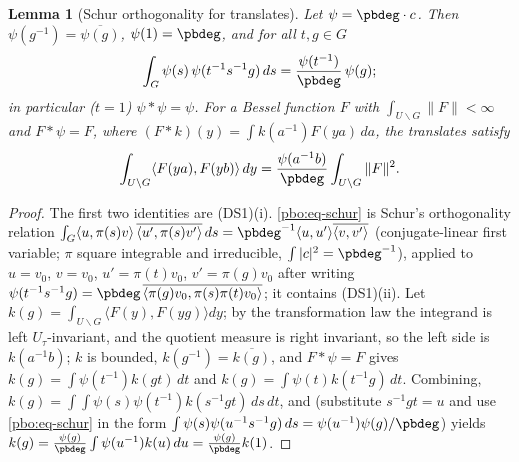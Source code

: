\documentclass[10pt]{amsart}
\newtheorem{lemma}[theorem]{Lemma}
\theoremstyle{definition}
\theoremstyle{remark}
\providecommand{\aubar}[1]{\overline{#1}}
\begin{document}
\begin{lemma}[Schur orthogonality for translates]\label{pbo:translates}
Let $\psi=\pbdeg\cdot c$. Then $\psi(g^{-1})=\aubar{\psi(g)}$, $\psi(1)=\pbdeg$, and for all $t,g\in G$
\begin{equation}\label{pbo:eq-schur}
\int_G\psi(s)\,\psi(t^{-1}s^{-1}g)\,ds=\frac{\psi(t^{-1})}{\pbdeg}\,\psi(g);
\end{equation}
in particular ($t=1$) $\psi*\psi=\psi$. For a Bessel function $F$ with $\int_{U\backslash G}\|F\|<\infty$ and $F*\psi=F$, where
$(F*k)(y)=\int k(a^{-1})F(ya)\,da$, the translates satisfy
\[
\int_{U\backslash G}\langle F(ya),F(yb)\rangle\,dy=\frac{\psi(a^{-1}b)}{\pbdeg}\int_{U\backslash G}\|F\|^2 .
\]
\end{lemma}
\begin{proof}
The first two identities are \textup{(DS1)(i)}. \eqref{pbo:eq-schur} is Schur's orthogonality relation
$\int_G\langle u,\pi(s)v\rangle\,\aubar{\langle u',\pi(s)v'\rangle}\,ds=\pbdeg^{-1}\langle u,u'\rangle\aubar{\langle v,v'\rangle}$
(conjugate-linear first variable; $\pi$ square integrable and irreducible, $\int|c|^2=\pbdeg^{-1}$), applied to
$u=v_0$, $v=v_0$, $u'=\pi(t)v_0$, $v'=\pi(g)v_0$ after writing $\psi(t^{-1}s^{-1}g)=\pbdeg\,\aubar{\langle\pi(g)v_0,
\pi(s)\pi(t)v_0\rangle}$; it contains \textup{(DS1)(ii)}.
Let $k(g)=\int_{U\backslash G}\langle F(y),F(yg)\rangle dy$; by the transformation law the integrand is left
$U_\tau$-invariant, and the quotient measure is right invariant, so the left side is $k(a^{-1}b)$; $k$ is
bounded, $k(g^{-1})=\aubar{k(g)}$, and $F*\psi=F$ gives $k(g)=\int\psi(t^{-1})k(gt)\,dt$ and $k(g)=\int\psi(t)
k(t^{-1}g)\,dt$. Combining, $k(g)=\int\int\psi(s)\psi(t^{-1})k(s^{-1}gt)\,ds\,dt$, and (substitute $s^{-1}gt=u$ and use \eqref{pbo:eq-schur} in the form $\int\psi(s)\psi(u^{-1}s^{-1}g)\,ds=\psi(u^{-1})\psi(g)/
\pbdeg$) yields $k(g)=\frac{\psi(g)}{\pbdeg}\int\psi(u^{-1})k(u)\,du=\frac{\psi(g)}{\pbdeg}k(1)$.
\end{proof}
\end{document}
